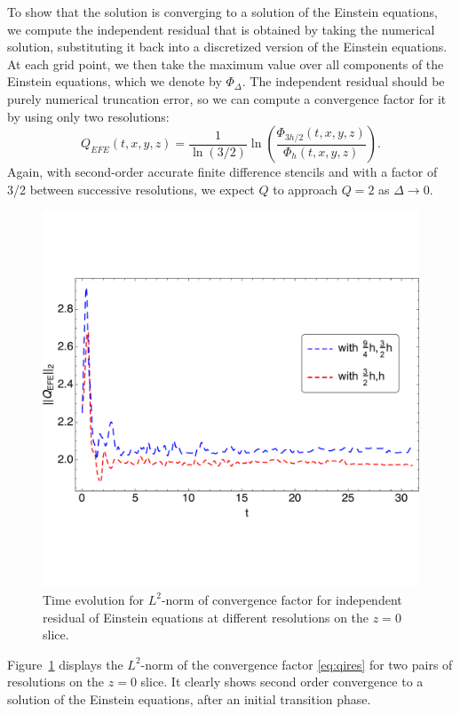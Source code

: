 \documentclass[aps,letterpaper,twocolumn,nofootinbib]{revtex4}
\numberwithin{equation}{section}
\begin{document}
To show that the solution is converging to a solution of the Einstein equations, we compute the independent residual that is obtained by taking the numerical solution, substituting it back into a discretized version of the Einstein equations.
At each grid point, we then take the maximum value over all components of the Einstein equations, which we denote by $\Phi_\Delta$. 
The independent residual should be purely numerical truncation error, so we can compute a convergence factor for it by using only two resolutions:
\begin{equation}\label{eq:qires}
Q_{EFE}(t,x,y,z)=\frac{1}{\ln(3/2)}\ln\left( \frac{\Phi_{3h/2}(t,x,y,z)}{\Phi_{h}(t,x,y,z)} \right).
\end{equation}
Again, with second-order accurate finite difference stencils and with a factor of 3/2 between successive resolutions, we expect $Q$ to approach $Q=2$ as $\Delta\rightarrow0$.
 \begin{figure}[t!]
        \centering
        \includegraphics[width=5.0in,clip=true]{fullplottL2normdim2boundedrescaledconvergenceiresallallres.pdf}
\parbox{5.0in}{\caption{Time evolution for $L^2$-norm of convergence factor for independent residual of Einstein equations at different resolutions on the $z=0$ slice.
        }\label{fig:L2norm_iresallconvergence-crop}}
\end{figure}
Figure~\ref{fig:L2norm_iresallconvergence-crop} displays the $L^2$-norm of the convergence factor \eqref{eq:qires} for two pairs of resolutions on the $z=0$ slice. It clearly shows second order convergence to a solution of the Einstein equations, after an initial transition phase. 




\end{document}
